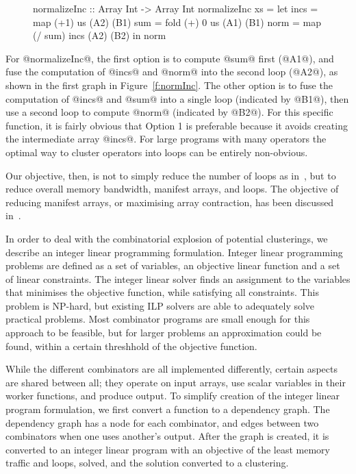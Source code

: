 \begin{figure}[H]
\begin{code}
 normalizeInc :: Array Int -> Array Int
 normalizeInc xs
  = let incs = map  (+1)    us      (A2) (B1)
        sum  = fold (+) 0   us      (A1) (B1)
        norm = map  (/ sum) incs    (A2) (B2)
    in  norm
\end{code}
\end{figure}
For @normalizeInc@, the first option is to compute @sum@ first (@A1@), and fuse the computation of @incs@ and @norm@ into the second loop (@A2@), as shown in the first graph in Figure~\ref{f:normInc}. The other option is to fuse the computation of @incs@ and @sum@ into a single loop (indicated by @B1@), then use a second loop to compute @norm@ (indicated by @B2@). For this specific function, it is fairly obvious that Option 1 is preferable because it avoids creating the intermediate array @incs@. For large programs with many operators the optimal way to cluster operators into loops can be entirely non-obvious. 

Our objective, then, is not to simply reduce the number of loops as in~\cite{kennedy1993typedfusion}, but to reduce overall memory bandwidth, manifest arrays, and loops.
The objective of reducing manifest arrays, or maximising array contraction, has been discussed in~\cite{gao1993collective, darte2002contraction}.

In order to deal with the combinatorial explosion of potential clusterings, we describe an integer linear programming formulation.
Integer linear programming problems are defined as a set of variables, an objective linear function and a set of linear constraints.
The integer linear solver finds an assignment to the variables that minimises the objective function, while satisfying all constraints.
This problem is NP-hard, but existing ILP solvers are able to adequately solve practical problems.
Most combinator programs are small enough for this approach to be feasible, but for larger problems an approximation could be found, within a certain threshhold of the objective function.



While the different combinators are all implemented differently, certain aspects are shared between all; they operate on input arrays, use scalar variables in their worker functions, and produce output.
To simplify creation of the integer linear program formulation, we first convert a function to a dependency graph.
The dependency graph has a node for each combinator, and edges between two combinators when one uses another's output.
After the graph is created, it is converted to an integer linear program with an objective of the least memory traffic and loops, solved, and the solution converted to a clustering.

